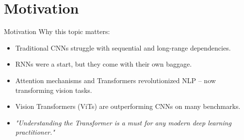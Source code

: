 \section{Motivation}
\begin{frame}{Motivation}
    \large Why this topic matters:
        \begin{itemize}
            \item Traditional CNNs struggle with sequential and long-range dependencies.
            \item RNNs were a start, but they come with their own baggage.
            \item Attention mechanisms and Transformers revolutionized NLP – now transforming vision tasks.
            \item Vision Transformers (ViTs) are outperforming CNNs on many benchmarks.
            \item \textit{"Understanding the Transformer is a must for any modern deep learning practitioner."}
        \end{itemize}
\end{frame}